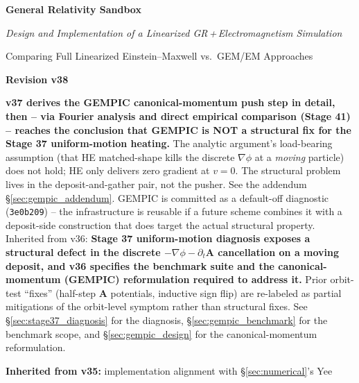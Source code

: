 \documentclass[11pt,a4paper]{article}
\newcommand{\vv}[1]{\mathbf{#1}}
\begin{document}

\begin{titlepage}
  \centering
  \vspace*{3cm}
  {\Huge\bfseries\color{deepblue} General Relativity Sandbox\par}
  \vspace{0.8cm}
  {\large\itshape Design and Implementation of a Linearized GR\,+\,Electromagnetism Simulation\par}
  \vspace{0.4cm}
  {\normalsize\color{gray} Comparing Full Linearized Einstein--Maxwell vs.\ GEM/EM Approaches\par}
  \vspace{1.2cm}
  {\large\bfseries\color{midblue} Revision v38\par}
  \vspace{0.2cm}
  {\small\color{gray}
  \textbf{v37 derives the GEMPIC canonical-momentum push step in
  detail, then -- via Fourier analysis and direct empirical comparison
  (Stage 41) -- reaches the conclusion that GEMPIC is NOT a
  structural fix for the Stage 37 uniform-motion heating.}  The
  analytic argument's load-bearing assumption (that HE matched-shape
  kills the discrete $\nabla\phi$ at a \emph{moving} particle) does
  not hold; HE only delivers zero gradient at $v=0$.  The structural
  problem lives in the deposit-and-gather pair, not the pusher.
  See the addendum §\ref{sec:gempic_addendum}.  GEMPIC is committed
  as a default-off diagnostic (\texttt{3e0b209}) -- the
  infrastructure is reusable if a future scheme combines it with a
  deposit-side construction that does target the actual structural
  property.
  Inherited from v36:
  \textbf{Stage 37 uniform-motion diagnosis exposes a structural defect
  in the discrete $-\nabla\phi - \partial_t\vv{A}$ cancellation on a
  moving deposit, and v36 specifies the benchmark suite and the
  canonical-momentum (GEMPIC) reformulation required to address it.}
  Prior orbit-test ``fixes'' (half-step $\vv{A}$ potentials, inductive
  sign flip) are re-labeled as partial mitigations of the orbit-level
  symptom rather than structural fixes.  See
  §\ref{sec:stage37_diagnosis} for the diagnosis, §\ref{sec:gempic_benchmark}
  for the benchmark scope, and §\ref{sec:gempic_design} for the
  canonical-momentum reformulation.\par
  \vspace{0.4em}
  \textbf{Inherited from v35:} implementation alignment with §\ref{sec:numerical}'s Yee
}
\end{titlepage}
\end{document}
